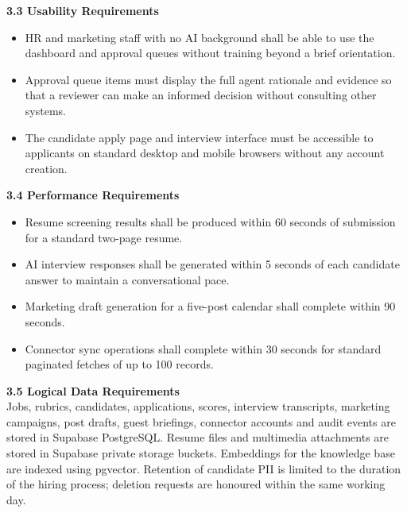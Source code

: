 \vspace{10pt}
\noindent\textbf{3.3 Usability Requirements}
\begin{itemize}
  \item HR and marketing staff with no AI background shall be able to use the dashboard and approval queues without training beyond a brief orientation.
  \item Approval queue items must display the full agent rationale and evidence so that a reviewer can make an informed decision without consulting other systems.
  \item The candidate apply page and interview interface must be accessible to applicants on standard desktop and mobile browsers without any account creation.
\end{itemize}

\vspace{10pt}
\noindent\textbf{3.4 Performance Requirements}
\begin{itemize}
  \item Resume screening results shall be produced within 60 seconds of submission for a standard two-page resume.
  \item AI interview responses shall be generated within 5 seconds of each candidate answer to maintain a conversational pace.
  \item Marketing draft generation for a five-post calendar shall complete within 90 seconds.
  \item Connector sync operations shall complete within 30 seconds for standard paginated fetches of up to 100 records.
\end{itemize}

\vspace{10pt}
\noindent\textbf{3.5 Logical Data Requirements}\\
Jobs, rubrics, candidates, applications, scores, interview transcripts, marketing campaigns, post drafts, guest briefings, connector accounts and audit events are stored in Supabase PostgreSQL. Resume files and multimedia attachments are stored in Supabase private storage buckets. Embeddings for the knowledge base are indexed using pgvector. Retention of candidate PII is limited to the duration of the hiring process; deletion requests are honoured within the same working day.

